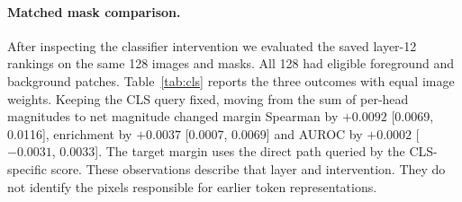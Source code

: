 \paragraph{Matched mask comparison.} After inspecting the classifier intervention we evaluated the saved layer-12 rankings on the same 128 images and masks. All 128 had eligible foreground and background patches. Table~\ref{tab:cls} reports the three outcomes with equal image weights. Keeping the CLS query fixed, moving from the sum of per-head magnitudes to net magnitude changed margin Spearman by $+0.0092$ [0.0069, 0.0116], enrichment by $+0.0037$ [0.0007, 0.0069] and AUROC by $+0.0002$ [$-0.0031$, 0.0033]. The target margin uses the direct path queried by the CLS-specific score. These observations describe that layer and intervention. They do not identify the pixels responsible for earlier token representations.
